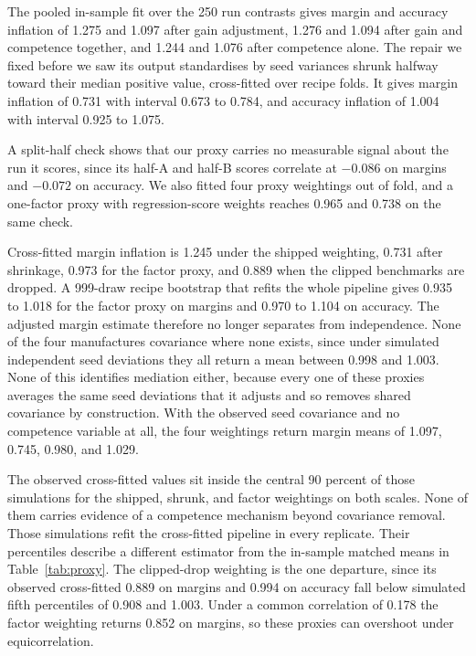The pooled in-sample fit over the 250 run contrasts gives margin and accuracy inflation of 1.275 and 1.097 after gain adjustment, 1.276 and 1.094 after gain and competence together, and 1.244 and 1.076 after competence alone. The repair we fixed before we saw its output standardises by seed variances shrunk halfway toward their median positive value, cross-fitted over recipe folds. It gives margin inflation of 0.731 with interval 0.673 to 0.784, and accuracy inflation of 1.004 with interval 0.925 to 1.075.

A split-half check shows that our proxy carries no measurable signal about the run it scores, since its half-A and half-B scores correlate at $-0.086$ on margins and $-0.072$ on accuracy. We also fitted four proxy weightings out of fold, and a one-factor proxy with regression-score weights reaches 0.965 and 0.738 on the same check.

Cross-fitted margin inflation is 1.245 under the shipped weighting, 0.731 after shrinkage, 0.973 for the factor proxy, and 0.889 when the clipped benchmarks are dropped. A 999-draw recipe bootstrap that refits the whole pipeline gives 0.935 to 1.018 for the factor proxy on margins and 0.970 to 1.104 on accuracy. The adjusted margin estimate therefore no longer separates from independence. None of the four manufactures covariance where none exists, since under simulated independent seed deviations they all return a mean between 0.998 and 1.003. None of this identifies mediation either, because every one of these proxies averages the same seed deviations that it adjusts and so removes shared covariance by construction. With the observed seed covariance and no competence variable at all, the four weightings return margin means of 1.097, 0.745, 0.980, and 1.029.

The observed cross-fitted values sit inside the central 90 percent of those simulations for the shipped, shrunk, and factor weightings on both scales. None of them carries evidence of a competence mechanism beyond covariance removal. Those simulations refit the cross-fitted pipeline in every replicate. Their percentiles describe a different estimator from the in-sample matched means in Table~\ref{tab:proxy}. The clipped-drop weighting is the one departure, since its observed cross-fitted 0.889 on margins and 0.994 on accuracy fall below simulated fifth percentiles of 0.908 and 1.003. Under a common correlation of 0.178 the factor weighting returns 0.852 on margins, so these proxies can overshoot under equicorrelation.

